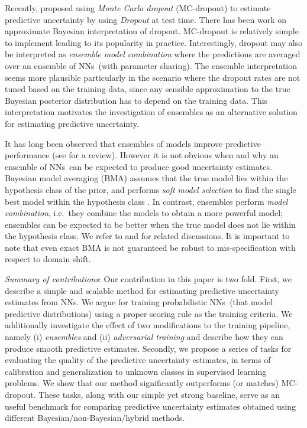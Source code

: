 \documentclass{article}
\newcommand{\nn}{NNs}
\begin{document}
Recently, \citet{gal} proposed using \emph{Monte Carlo dropout} (MC-dropout) to estimate predictive uncertainty by using \emph{Dropout} \citep{dropout} at test time. There has been work on approximate Bayesian interpretation \citep{maeda2014,gal,variationaldropout} of dropout. MC-dropout is relatively simple to implement leading to its popularity in practice. 
Interestingly, dropout may also be interpreted as \emph{ensemble model combination} \citep{dropout} where the predictions are averaged over an ensemble of \nn~(with parameter sharing). The ensemble interpretation seems more plausible particularly in the scenario where the dropout rates are not tuned based on the training data, since any sensible approximation to the true Bayesian posterior distribution has to depend on the training data. 
This interpretation motivates the investigation of ensembles as an alternative solution for estimating predictive uncertainty. 

It has long been observed that ensembles of models improve predictive performance (see \citep{dietterich2000ensemble} for a review). However it is not obvious when and why an ensemble of \nn~can be expected  to produce good uncertainty estimates. 
Bayesian model averaging (BMA) assumes that the true model lies within the hypothesis class of the prior, and performs \emph{soft model selection} to find the single best model within the hypothesis class \citep{minka2000bayesian}. %
In contrast, ensembles perform \emph{model combination},  i.e.~they combine the models to obtain a more powerful model; ensembles can be expected to be better when the true model does not lie within the hypothesis class. 
We refer to \citep{minka2000bayesian,clarke2003comparing} and \citep[\S2.5]{balajithesis} for related discussions. It is important to note that even exact BMA is not guaranteed be robust to mis-specification with respect to domain shift. %

\emph{Summary of contributions}:  Our contribution in this paper is two fold. First, we describe a simple and scalable method for estimating predictive
uncertainty estimates from \nn. %
We argue for training probabilistic \nn~(that model predictive distributions) using a proper scoring rule as the training criteria.  
We additionally investigate the effect of two modifications to the training pipeline, namely (i) \emph{ensembles} and (ii) \emph{adversarial training} \citep{adversarial} and describe how they can produce smooth predictive estimates. %
Secondly, we propose a series of tasks for evaluating the quality of the predictive uncertainty estimates, in terms of
calibration and generalization to unknown classes in supervised learning problems. %
We show that our method significantly outperforms (or matches) MC-dropout. %
These tasks, along with our simple yet strong baseline, serve as an useful benchmark for comparing predictive uncertainty estimates obtained using different Bayesian/non-Bayesian/hybrid methods. 
 
\end{document}
